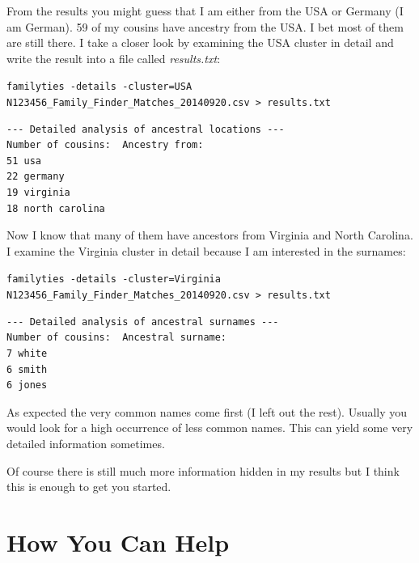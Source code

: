 \documentclass[12pt,a4paper]{article}
\begin{document}
From the results you might guess that I am either from the
USA or Germany (I am German). 59 of my cousins have ancestry
from the USA. I bet most of them are still there. I take a
closer look by examining the USA cluster in detail and write
the result into a file called \emph{results.txt}:

\vspace{1em}
\noindent\texttt{familyties -details -cluster=USA \\
N123456\_Family\_Finder\_Matches\_20140920.csv > results.txt}

\begin{verbatim}
--- Detailed analysis of ancestral locations ---
Number of cousins:  Ancestry from:
51 usa
22 germany
19 virginia
18 north carolina
\end{verbatim}

Now I know that many of them have ancestors from Virginia
and North Carolina. I examine the Virginia cluster in detail
because I am interested in the surnames:

\vspace{1em}
\noindent\texttt{familyties -details -cluster=Virginia \\
N123456\_Family\_Finder\_Matches\_20140920.csv > results.txt}

\begin{verbatim}
--- Detailed analysis of ancestral surnames ---
Number of cousins:  Ancestral surname:
7 white
6 smith
6 jones
\end{verbatim}

As expected the very common names come first (I left out
the rest). Usually you would look for a high occurrence
of less common names. This can yield some very detailed
information sometimes. 

Of course there is still much more information hidden in 
my results but I think this is enough to get you started.


\section{How You Can Help}
\end{document}

